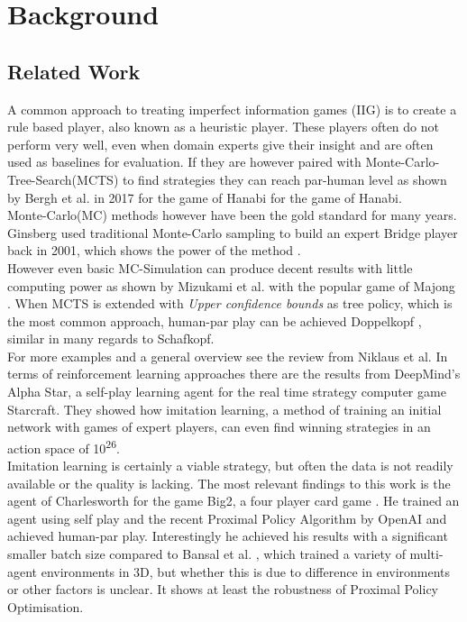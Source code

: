 \chapter{Background}


\section{Related Work}
A common approach to treating imperfect information games (IIG) is to create a rule based player, also known as a
heuristic player.
These players often do not perform very well, even when domain experts give their insight and are often used as
baselines for evaluation.
If they are however paired with Monte-Carlo-Tree-Search(MCTS) to find strategies they can reach par-human level as
shown by Bergh et al. in 2017 for the game of Hanabi\cite{hanabi} for the game of Hanabi.\\
Monte-Carlo(MC) methods however have been the gold standard for many years.
Ginsberg used traditional Monte-Carlo sampling to build an expert Bridge player back in 2001, which shows the power
of the method \cite{gib}.\\
However even basic MC-Simulation can produce decent results with little computing power as shown by Mizukami et al.
with the popular game of Majong \cite{mahjong}.
When MCTS is extended with \textit{Upper confidence bounds} as tree policy, which is the most common approach,
human-par play can be achieved Doppelkopf \cite{Doppelkopf}, similar in many regards to Schafkopf.\\
For more examples and a general overview see the review from Niklaus et al. \cite{niklaus2019survey}
\newline
In terms of reinforcement learning approaches there are the results from DeepMind's Alpha Star, a self-play learning
agent for the real time strategy computer game Starcraft.
They showed how imitation learning, a method of training an initial network with games of expert players, can even find
winning strategies in an action space of 10\textsuperscript{26}. \cite{Vinyals2019}\\
Imitation learning is certainly a viable strategy, but often the data is not readily available or the quality is
lacking.
\newline
The most relevant findings to this work is the agent of Charlesworth for the game Big2, a four player card game
.\cite{Charlesworth2018}
He trained an agent using self play and the recent Proximal Policy Algorithm by OpenAI \cite{Schulman2017} and
achieved human-par play.
Interestingly he achieved his results with a significant smaller batch size compared to Bansal et al.
\cite{Bansal2017}, which trained a variety of multi-agent environments in 3D, but whether this is due to
difference in environments or other factors is unclear.
It shows at least the robustness of Proximal Policy Optimisation.


